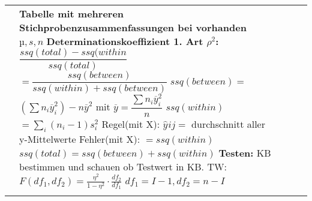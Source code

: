 \documentclass[fleqn, oneside, 10pt, titlepage]{article}
\begin{document}
{\begin{tabularx}{\textwidth}{p{13em}p{13em}p{13em}p{13em}p{10em}}
 &
 \textbf{Tabelle mit mehreren Stichprobenzusammenfassungen bei vorhanden $µ, s, n$}
\textbf{Determinationskoeffizient 1. Art \newline $\rho^2$:}
$\dfrac{ssq(total) -ssq(within}{ssq(total)}$ \newline 
$= \dfrac{ssq(between)}{ssq(within) + ssq(between)} $ \newline\newline
$ssq(between) =$\newline$ (\sum n_i \overline{y}_i^2) - n \overline{y}^2$ mit \newline\newline
$\overline{y} = \dfrac{\sum n_i \overline{y}_i^2}{n} $ \newline 
$ssq(within)$ \newline $ = \sum_i (n_i -1) s_i^2$ \newline \newline
Regel(mit X): $\hat{y}_{}ij = $ durchschnitt aller y-Mittelwerte
Fehler(mit X): $= ssq(within)$ \newline
$ssq(total) = ssq(between) + ssq(within)$ \newline
\newline
\textbf{Testen:}\newline
KB bestimmen und schauen ob Testwert in KB.\newline
TW: $F(df_1,df_2) = \frac{\eta^2}{1-\eta^2} \cdot \frac{df_2}{df_1}$ \newline
$df_1 = I-1, df_2 = n-I$
 &
 
 &

 \\

 &

 &

 &
 
 &

 \\ 
\end{tabularx} 
}
\end{document}
